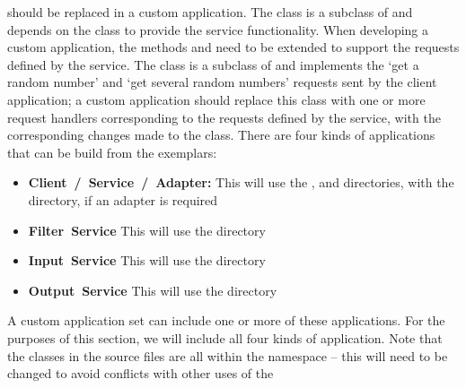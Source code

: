  should be replaced in a custom application.
The  class is a subclass of
 and depends on the
 class to provide the service functionality.
When developing a custom application, the methods  and
 need to be extended to support the requests defined by the
service.
The  class is a subclass of
 and implements the `get a random number' and
`get several random numbers' requests sent by the 
client application; a custom application should replace this class with one or more
request handlers corresponding to the requests defined by the service, with the
corresponding changes made to the  class.
\secondaryEnd{}
There are four kinds of applications that can be build from the exemplars:
\begin{itemize}
\item \textbf{Client~/~Service~/~Adapter:} This will use the
,  and
 directories, with the 
directory, if an adapter is required
\item \textbf{Filter~Service} This will use the 
directory
\item \textbf{Input~Service} This will use the 
directory
\item \textbf{Output~Service} This will use the 
directory 
\end{itemize}
A custom application set can include one or more of these applications.
For the purposes of this section, we will include all four kinds of application.
\tertiaryEnd{}
Note that the classes in the source files are all within the 
namespace -- this will need to be changed to avoid conflicts with other uses of the
